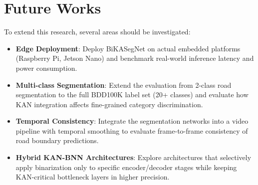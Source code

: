 \documentclass[a4paper]{report}
\begin{document}
\section{Future Works}
To extend this research, several areas should be investigated:
\begin{itemize}
    \item \textbf{Edge Deployment}: Deploy BiKASegNet on actual embedded platforms (Raspberry Pi, Jetson Nano) and benchmark real-world inference latency and power consumption.
    \item \textbf{Multi-class Segmentation}: Extend the evaluation from 2-class road segmentation to the full BDD100K label set (20+ classes) and evaluate how KAN integration affects fine-grained category discrimination.
    \item \textbf{Temporal Consistency}: Integrate the segmentation networks into a video pipeline with temporal smoothing to evaluate frame-to-frame consistency of road boundary predictions.
    \item \textbf{Hybrid KAN-BNN Architectures}: Explore architectures that selectively apply binarization only to specific encoder/decoder stages while keeping KAN-critical bottleneck layers in higher precision.
\end{itemize}
\newpage
\nocite{}
\thispagestyle{noNumber}


\end{document}
